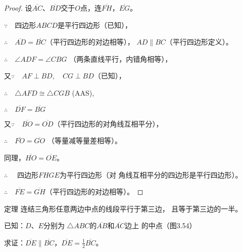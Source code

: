 \begin{proof}
    设$\overline{AC}$、$\overline{BD}$交于$O$点，连$\overline{FH}$，$\overline{EG}$。

$\because\quad $四边形$ABCD$是平行四边形（已知），

$\therefore\quad \overline{AD}=\overline{BC}$（平行四边形的对边相等），
$AD\parallel BC$（平行四边形定义）。

$\therefore\quad \angle ADF=\angle CBG$ （两条直线平行，内错角相等），

又$\because\quad AF\perp BD,\quad CG\perp BD$（已知），

$\therefore\quad \triangle AFD\cong \triangle CGB$ (AAS),

$\therefore\quad \overline{DF}=\overline{BG}$

又$\because\quad \overline{BO}=\overline{OD}$（平行四边形的对角线互相平分），

$\therefore\quad \overline{FO}=\overline{GO}$ （等量减等量差相等）。

同理，$\overline{HO}=\overline{OE}$。

$\therefore\quad$ 四边形$FHGE$为平行四边形（对
角线互相平分的四边形是平行四边形）。

$\therefore\quad \overline{FE}=\overline{GH}$（平行四边形的对边相等）。
\end{proof}

\begin{Theorem}
{定理} 连结三角形任意两边中点的线段平行于第三边，
且等于第三边的一半。    
\end{Theorem}

已知：$D$、$E$分别为
$\triangle ABC$的$\overline{AB}$和$\overline{AC}$边上
的中点（图3.54）

求证：$\overline{DE}\parallel \overline{BC}$，$\overline{DE}=\frac{1}{2}\overline{BC}$。

\begin{figure}
    \centering
\begin{tikzpicture}
\end{tikzpicture}
    \caption{}
\end{figure}

